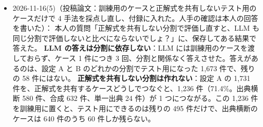 \documentclass[11pt,a4paper]{jsarticle}
\begin{document}
\begin{itemize}[nosep]
    \textbf{用意したもの}：基準 4 つの案と、記録の残る確認のためのチェックシート。\texttt{paper/cace/make\_manual\_check\_sheet.py}（単体テスト 10 件）が、設定 A の評価用のケース 1,731 件から、種類の件数の割合に合わせて 50 件（単一出典 3 件、出典横断 18 件、合成 29 件）を無作為に選び（乱数の種 20261116、標本は \texttt{paper/cace/data/manual\_check\_sample.json}）、1 件ごとに説明文、入出力変数、正解式（表記、出典、分野、文脈、変数の定義）、2 本以上の正解式に現れる記号の式ごとの定義を並べた HTML を作る（\texttt{docs/build/manual\_check/check\_sheet.html}。式データベースの式を含むので git に入れない）。基準は、C1「説明文が求めているモデルを、正解式が表している」、C2「出力変数は、説明文が求めている量である」、C3「2 本以上の正解式に現れる記号は、どの式でも同じ量を指している」、C4「入力変数の値を与えると、正解式を組み合わせて出力変数が求まる」。式が元の文献のとおりに抽出されているかどうかは確かめない。シートは、数式を KaTeX で組み、途中経過をブラウザに保存し、結果を CSV（\texttt{case\_id}、C1〜C4、メモ）で書き出す。手元のブラウザで、数式 2,330 個のうち 2,325 個が組めること、回答の保存と CSV の書き出しが動くことを確かめた。
    \textbf{見込み}：標本の 50 件（正解式は合わせて 179 本）のうち 41 件に、2 本以上の正解式に現れる記号がある。15 件（出典横断 5 件、合成 10 件）には、言語モデルが「式によって別の量」と判定した記号がある。たとえば \texttt{ms3\_0094} の $n$ は、一方の式で「移動する電子の数」、もう一方で「当てはめた速度定数」である。C3 では「いいえ」が出る。
    \textbf{確認}：論文は \texttt{latexmk} が exit 0 で 71 ページ、本文 9,592 語、原稿の点検は合格。全テストは 791 passed、3 skipped、1 failed（\texttt{tests/test\_fig\_overview.py}。この作業と関係のない、前からの失敗）。
  \item 2026-11-16(5)（投稿論文：訓練用のケースと正解式を共有しないテスト用のケースだけで 4 手法を採点し直し、付録に入れた。人手の確認は本人の回答を書いた）：
    本人の質問「正解式を共有しない分割で評価し直すと、LLM も同じ分割で評価しないと比べにならないでしょ？」に、保存してある結果で答えた。
    \textbf{LLM の答えは分割に依存しない}：LLM には訓練用のケースを渡しておらず、ケース 1 件につき 3 回、分割と関係なく答えさせた。答えがあるのは、設定 A と B のどれかの分割でテスト用になった 1,673 件で、残りの 58 件にはない。
    \textbf{正解式を共有しない分割は作れない}：設定 A の 1,731 件を、正解式を共有するケースどうしでつなぐと、1,236 件（71.4\%。出典横断 580 件、合成 632 件、単一出典 24 件）が 1 つにつながる。この 1,236 件を訓練用に置くと、テスト用にできるのは残りの 495 件だけで、出典横断のケースは 640 件のうち 60 件しか残らない。

\end{itemize}
\end{document}
